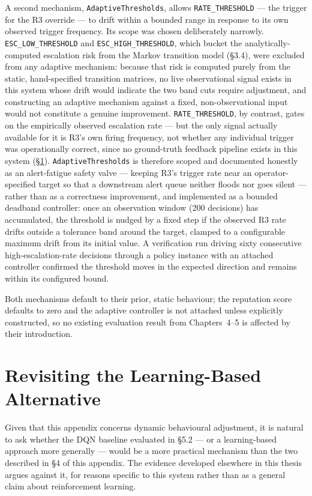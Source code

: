 A second mechanism, \texttt{AdaptiveThresholds}, allows
\texttt{RATE\_THRESHOLD} --- the trigger for the R3 override --- to drift
within a bounded range in response to its own observed trigger frequency.
Its scope was chosen deliberately narrowly.
\texttt{ESC\_LOW\_THRESHOLD} and \texttt{ESC\_HIGH\_THRESHOLD}, which
bucket the analytically-computed escalation risk from the Markov
transition model (\S3.4), were excluded from any adaptive mechanism:
because that risk is computed purely from the static, hand-specified
transition matrices, no live observational signal exists in this system
whose drift would indicate the two band cuts require adjustment, and
constructing an adaptive mechanism against a fixed, non-observational
input would not constitute a genuine improvement. \texttt{RATE\_THRESHOLD},
by contrast, gates on the empirically observed escalation rate --- but
the only signal actually available for it is R3's own firing frequency,
not whether any individual trigger was operationally correct, since no
ground-truth feedback pipeline exists in this system
(\S\ref{sec:app_c_dqn}). \texttt{AdaptiveThresholds} is therefore scoped
and documented honestly as an alert-fatigue safety valve --- keeping R3's
trigger rate near an operator-specified target so that a downstream alert
queue neither floods nor goes silent --- rather than as a correctness
improvement, and implemented as a bounded deadband controller: once an
observation window (200 decisions) has accumulated, the threshold is
nudged by a fixed step if the observed R3 rate drifts outside a tolerance
band around the target, clamped to a configurable maximum drift from its
initial value. A verification run driving sixty consecutive
high-escalation-rate decisions through a policy instance with an attached
controller confirmed the threshold moves in the expected direction and
remains within its configured bound.

Both mechanisms default to their prior, static behaviour; the reputation
score defaults to zero and the adaptive controller is not attached unless
explicitly constructed, so no existing evaluation result from
Chapters~4--5 is affected by their introduction.

\section{Revisiting the Learning-Based Alternative}
\label{sec:app_c_dqn}

Given that this appendix concerns dynamic behavioural adjustment, it is
natural to ask whether the DQN baseline evaluated in \S5.2 --- or a
learning-based approach more generally --- would be a more practical
mechanism than the two described in \S4 of this appendix. The evidence
developed elsewhere in this thesis argues against it, for reasons
specific to this system rather than as a general claim about
reinforcement learning.

